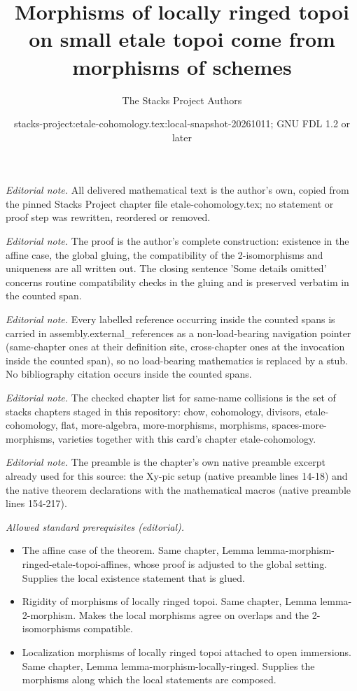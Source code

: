 \documentclass[10pt,a4paper]{amsart}
\title{Morphisms of locally ringed topoi on small etale topoi come from morphisms of schemes}
\author{The Stacks Project Authors}
\date{stacks-project:etale-cohomology.tex:local-snapshot-20261011; GNU FDL 1.2 or later}
\theoremstyle{plain}
\theoremstyle{definition}
\theoremstyle{remark}
\numberwithin{equation}{subsection}
\begin{document}
\maketitle
\noindent\textit{Editorial note.} All delivered mathematical text is the author's own, copied from the pinned Stacks Project chapter file etale-cohomology.tex; no statement or proof step was rewritten, reordered or removed.\par\medskip
\noindent\textit{Editorial note.} The proof is the author's complete construction: existence in the affine case, the global gluing, the compatibility of the 2-isomorphisms and uniqueness are all written out. The closing sentence 'Some details omitted' concerns routine compatibility checks in the gluing and is preserved verbatim in the counted span.\par\medskip
\noindent\textit{Editorial note.} Every labelled reference occurring inside the counted spans is carried in assembly.external\_references as a non-load-bearing navigation pointer (same-chapter ones at their definition site, cross-chapter ones at the invocation inside the counted span), so no load-bearing mathematics is replaced by a stub. No bibliography citation occurs inside the counted spans.\par\medskip
\noindent\textit{Editorial note.} The checked chapter list for same-name collisions is the set of stacks chapters staged in this repository: chow, cohomology, divisors, etale-cohomology, flat, more-algebra, more-morphisms, morphisms, spaces-more-morphisms, varieties together with this card's chapter etale-cohomology.\par\medskip
\noindent\textit{Editorial note.} The preamble is the chapter's own native preamble excerpt already used for this source: the Xy-pic setup (native preamble lines 14-18) and the native theorem declarations with the mathematical macros (native preamble lines 154-217).\par\medskip
\noindent\textit{Allowed standard prerequisites (editorial).}\begin{itemize}
\item The affine case of the theorem. Same chapter, Lemma lemma-morphism-ringed-etale-topoi-affines, whose proof is adjusted to the global setting. Supplies the local existence statement that is glued.
\item Rigidity of morphisms of locally ringed topoi. Same chapter, Lemma lemma-2-morphism. Makes the local morphisms agree on overlaps and the 2-isomorphisms compatible.
\item Localization morphisms of locally ringed topoi attached to open immersions. Same chapter, Lemma lemma-morphism-locally-ringed. Supplies the morphisms along which the local statements are composed.
\end{itemize}\medskip
\end{document}
